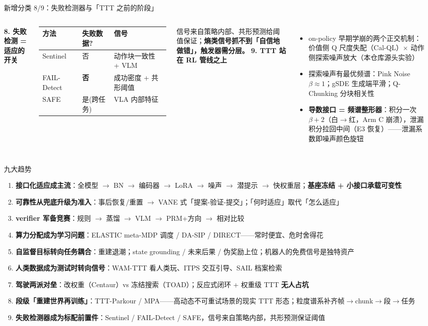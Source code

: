 \documentclass[10pt,aspectratio=169]{beamer}
\newcommand{\hl}[1]{\textcolor{good}{\textbf{#1}}}
\newcommand{\wa}[1]{\textcolor{warn}{\textbf{#1}}}
\begin{document}
\begin{frame}{新增分类 8/9：失败检测器与「TTT 之前的阶段」}
\begin{columns}[T]
\textbf{8. 失败检测 = 适应的开关}
\small
\begin{tabular}{lll}
\toprule
方法 & 失败数据? & 信号\\
\midrule
Sentinel & 否 & 动作块一致性 + VLM\\
FAIL-Detect & \hl{否} & 成功密度 + 共形阈值\\
SAFE & 是(跨任务) & VLA 内部特征\\
\bottomrule
\end{tabular}
\vspace{4pt}

信号来自策略内部、共形预测给阈值保证；\wa{熵类信号抓不到「自信地做错」，触发器需分层。}
\textbf{9. TTT 站在 RL 管线之上}
\begin{itemize}
\item on-policy 早期学崩的两个正交机制：价值侧 Q 尺度失配（Cal-QL）$\times$ 动作侧探索噪声放大（本仓库源头实验）
\item 探索噪声有最优频谱：Pink Noise $\beta\approx1$；gSDE 生成端平滑；Q-Chunking 分块相关性
\item \hl{导数接口 = 频谱整形器}：积分一次 $\beta{+}2$（白$\to$红，Arm C 崩溃），泄漏积分拉回中间（E3 恢复）——泄漏系数即噪声颜色旋钮
\end{itemize}
\end{columns}
\end{frame}

\begin{frame}{九大趋势}
\small
\begin{enumerate}
\item \textbf{接口化适应成主流}：全模型 $\to$ BN $\to$ 编码器 $\to$ LoRA $\to$ 噪声 $\to$ 潜提示 $\to$ 快权重层；\hl{基座冻结 + 小接口承载可变性}
\item \textbf{可靠性从兜底升级为准入}：事后恢复/重置 $\to$ VANE 式「提案-验证-提交」；「何时适应」取代「怎么适应」
\item \textbf{verifier 军备竞赛}：规则 $\to$ 蒸馏 $\to$ VLM $\to$ PRM+方向 $\to$ 相对比较
\item \textbf{算力分配成为学习问题}：ELASTIC meta-MDP 调度 / DA-SIP / DIRECT——常时便宜、危时舍得花
\item \textbf{自监督目标转向任务耦合}：重建退潮；state grounding / 未来后果 / 伪奖励上位；机器人的免费信号是独特资产
\item \textbf{人类数据成为测试时转向信号}：WAM-TTT 看人类玩、ITPS 交互引导、SAIL 档案检索
\item \textbf{驾驶两派对垒}：改权重（Centaur）vs 冻结搜索（TOAD）；反应式闭环 + 权重级 TTT \hl{无人占坑}
\item \textbf{段级「重建世界再训练」}：TTT-Parkour / MPA——高动态不可重试场景的现实 TTT 形态；粒度谱系补齐帧$\to$chunk$\to$段$\to$任务
\item \textbf{失败检测器成为标配前置件}：Sentinel / FAIL-Detect / SAFE，信号来自策略内部，共形预测保证阈值
\end{enumerate}
\end{frame}
\end{document}
